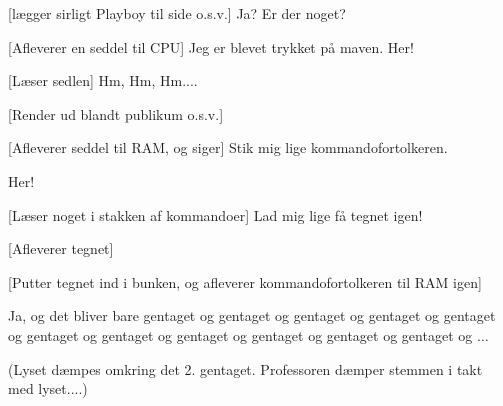\documentclass[a4paper,11pt]{article}
\begin{document}
\begin{sketch}
[lægger sirligt Playboy til side o.s.v.] Ja? Er der noget?

[Afleverer en seddel til CPU] Jeg er blevet trykket
på maven. Her!

[Læser sedlen] Hm, Hm, Hm....

[Render ud blandt publikum o.s.v.]

[Afleverer seddel til RAM, og siger] Stik mig lige
kommandofortolkeren.

 Her!

[Læser noget i stakken af kommandoer] Lad mig lige få
tegnet igen!

[Afleverer tegnet]

[Putter tegnet ind i bunken, og afleverer
kommandofortolkeren til RAM igen]

 Ja, og det bliver bare gentaget og gentaget og
gentaget og gentaget og gentaget og gentaget og gentaget og gentaget
og gentaget og gentaget og gentaget og $\ldots$

\scene 
(Lyset dæmpes omkring det 2. gentaget. Professoren dæmper stemmen i
takt med lyset....)

\end{sketch}
\end{document}
